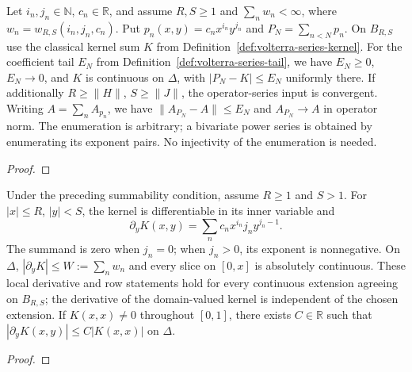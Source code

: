 \begin{theorem}
\label{thm:volterra-series-approximation}
\leanok
Let $i_n,j_n\in\mathbb N$, $c_n\in\mathbb R$, and assume $R,S\ge1$ and
$\sum_nw_n<\infty$, where $w_n=w_{R,S}(i_n,j_n,c_n)$.
Put $p_n(x,y)=c_nx^{i_n}y^{j_n}$ and $P_N=\sum_{n<N}p_n$.
On $B_{R,S}$ use the classical kernel sum $K$ from
Definition~\ref{def:volterra-series-kernel}.
For the coefficient tail $E_N$ from Definition~\ref{def:volterra-series-tail},
we have $E_N\ge0$, $E_N\to0$, and $K$ is continuous on $\Delta$, with
$|P_N-K|\le E_N$ uniformly there.
If additionally $R\ge\|H\|$, $S\ge\|J\|$, the operator-series input is
convergent. Writing $A=\sum_n A_{p_n}$, we have
$\|A_{P_N}-A\|\le E_N$ and $A_{P_N}\to A$ in operator norm.
The enumeration is arbitrary; a bivariate power series is obtained by enumerating
its exponent pairs. No injectivity of the enumeration is needed.
\end{theorem}
\begin{proof}
\leanok
\end{proof}

\begin{theorem}
\label{thm:volterra-series-regularity}
\leanok
Under the preceding summability condition, assume $R\ge1$ and $S>1$.
For $|x|\le R$, $|y|<S$, the kernel is differentiable in its inner variable and
\[
 \partial_yK(x,y)=\sum_n c_nx^{i_n}j_n y^{j_n-1}.
\]
The summand is zero when $j_n=0$; when $j_n>0$, its exponent is nonnegative.
On $\Delta$, $|\partial_yK|\le W:=\sum_n w_n$ and every slice on $[0,x]$
is absolutely continuous. These local derivative and row statements hold for
 every continuous extension agreeing on $B_{R,S}$; the derivative of the
 domain-valued kernel is independent of the chosen extension.
 If $K(x,x)\ne0$ throughout $[0,1]$, there exists
$C\in\mathbb R$ such that $|\partial_yK(x,y)|\le C|K(x,x)|$ on $\Delta$.
\end{theorem}
\begin{proof}
\leanok
\end{proof}

